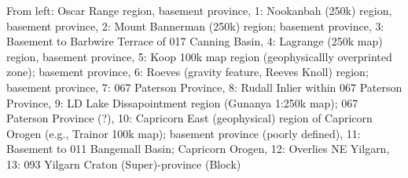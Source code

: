 From left: Oscar Range region, basement province, 1: Nookanbah (250k) region, basement province, 2: Mount Bannerman (250k) region; basement province, 3: Basement to Barbwire Terrace of 017 Canning Basin, 4: Lagrange (250k map) region, basement province, 5: Koop 100k map region (geophysicallly overprinted zone); basement province, 6: Roeves (gravity feature, Reeves Knoll) region; basement province, 7: 067 Paterson Province, 8: Rudall Inlier within  067 Paterson Province, 9: LD Lake Dissapointment  region (Gunanya 1:250k map); 067 Paterson Province (?), 10: Capricorn East (geophysical) region of Capricorn Orogen (e.g., Trainor 100k map); basement province (poorly defined), 11: Basement to 011 Bangemall Basin; Capricorn Orogen, 12: Overlies NE Yilgarn, 13: 093 Yilgarn Craton (Super)-province (Block)
